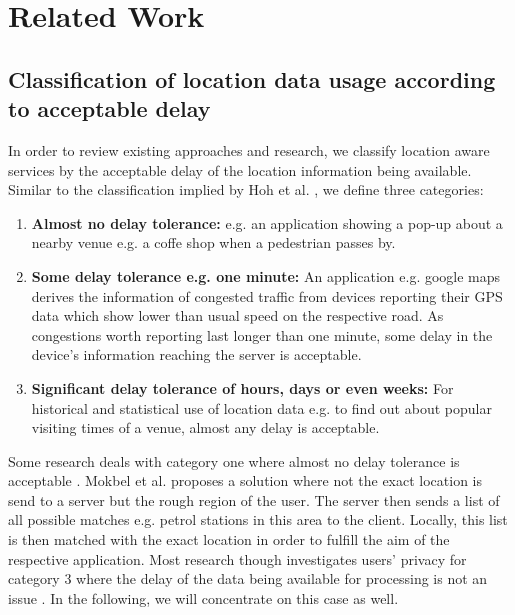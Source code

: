 \chapter{Related Work}\label{chapter:related-work}

\section{Classification of location data usage according to acceptable delay}
In order to review existing approaches and research, we classify location aware services by the acceptable delay of the location information being available. Similar to the classification implied by Hoh et al. \parencite{hoh2005protecting}, we define three categories:
\begin{enumerate}
  \item \textbf{Almost no delay tolerance:} e.g. an application showing a pop-up about a nearby venue e.g. a coffe shop when a pedestrian passes by.
  \item \textbf{Some delay tolerance e.g. one minute:} An application e.g. google maps derives the information of congested traffic from devices reporting their GPS data which show lower than usual speed on the respective road. As congestions worth reporting last longer than one minute, some delay in the device's information reaching the server is acceptable.
  \item \textbf{Significant delay tolerance of hours, days or even weeks:} For historical and statistical use of location data e.g. to find out about popular visiting times of a venue, almost any delay is acceptable.
\end{enumerate}
Some research deals with category one where almost no delay tolerance is acceptable \parencite{location-privacy, mix-zones}. Mokbel et al. \parencite{casper} proposes a solution where not the exact location is send to a server but the rough region of the user. The server then sends a list of all possible matches e.g. petrol stations in this area to the client. Locally, this list is then matched with the exact location in order to fulfill the aim of the respective application.
Most research though investigates users' privacy for category 3 where the delay of the data being available for processing is not an issue \parencite{krumm, cellphone, privacy-home-work-pairs, twitter}. In the following, we will concentrate on this case as well.

